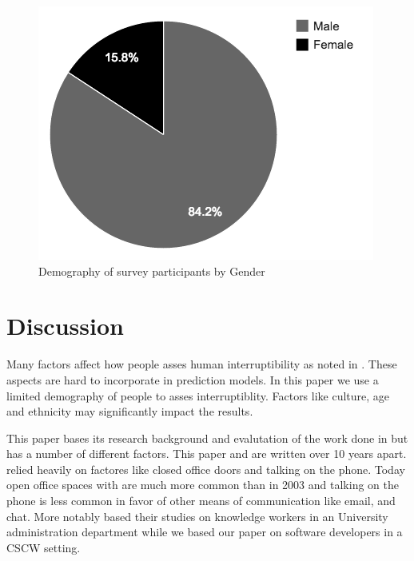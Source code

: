 \documentclass{sigchi}
\begin{document}
\begin{figure}[h]
  \centering
  \includegraphics[width=\columnwidth]{figures/demography_gender.png}
  \caption{Demography of survey participants by Gender}
  \label{fig:demography_gender}
\end{figure}





\section{Discussion}


Many factors affect how people asses human interruptibility as noted in \cite{Avrahami2007}.
These aspects are hard to incorporate in prediction models.
In this paper we use a limited demography of people to asses interruptiblity.
Factors like culture, age and ethnicity may significantly impact the results.

This paper bases its research background and evalutation of the work done in \cite{fogarty2005predicting} but has a number of different factors. This paper and \cite{fogarty2005predicting} are written over 10 years apart. \cite{fogarty2005predicting} relied heavily on factores like closed office doors and talking on the phone. Today open office spaces with are much more common than in 2003 and talking on the phone is less common in favor of other means of communication like email, and chat. More notably \cite{fogarty2005predicting} based their studies on knowledge workers in an University administration department while we based our paper on software developers in a CSCW setting.
\end{document}
